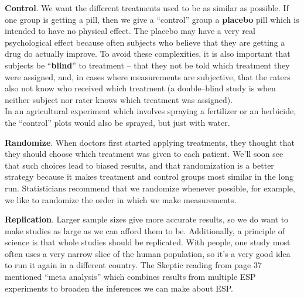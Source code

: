   {\bf Control}.  We want the different treatments used to be as
  similar as possible.  If one group is getting a pill, then we give
  a ``control'' group a {\bf placebo} pill which is intended to have no
  physical effect.  The placebo may have a very real psychological effect 
  because often subjects who believe that they are getting a drug 
  do actually improve.  To avoid these complexities, it is also
  important that subjects be ``{\bf blind}'' to treatment -- that they
  not be told which treatment they were assigned, and, in cases where
  measurements are subjective, that the raters also not know who
  received which treatment (a double--blind study is when neither
  subject nor rater knows which treatment was assigned).  
  \\
  In an agricultural experiment which involves spraying a fertilizer
  or an herbicide, the ``control'' plots would also be sprayed, but just
  with water. 

  {\bf Randomize}.  When doctors first started applying treatments,
  they thought that they should choose which treatment was given to each
  patient. We'll soon see that such choices lead to biased results, and
  that randomization is a better strategy because it makes treatment
  and control groups most similar in the long run.  Statisticians
  recommend that we randomize whenever possible, for example, we like
  to randomize the order in which we make measurements.

  {\bf Replication}. Larger sample sizes give more accurate results,
  so we do want to make studies as large as we can afford them to
  be. Additionally, a principle of science is that  whole
  studies should be replicated.  With people, one study most often uses a
  very narrow slice of the human population, so it's a very good idea
  to run it again in a different country.  The Skeptic reading from
  page 37 mentioned ``meta analysis'' which combines results from
  multiple ESP experiments to broaden the inferences we can make about
  ESP. 

